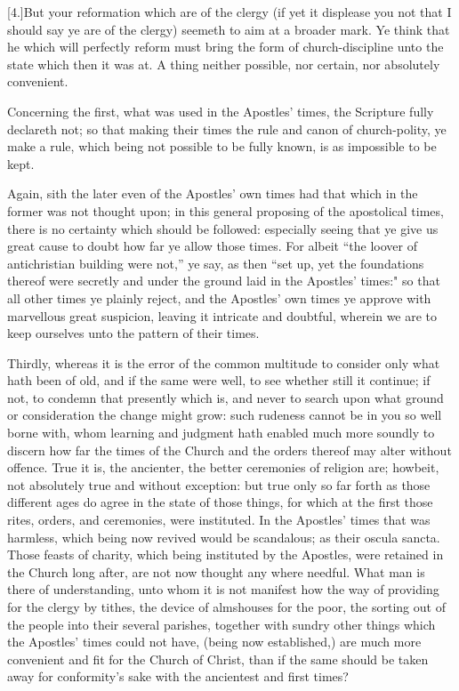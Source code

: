 [4.]But your reformation which are of the clergy (if yet it displease you not that I should say ye are of the clergy) seemeth to aim at a broader mark. Ye think that he which will perfectly reform must bring the form of church-discipline unto the state which then it was at. A thing neither possible, nor certain, nor absolutely convenient.

Concerning the first, what was used in the Apostles’ times, the Scripture fully declareth not; so that making their times the rule and canon of church-polity, ye make a rule, which being not possible to be fully known, is as impossible to be kept.

Again, sith the later even of the Apostles’ own times had that which in the former was not thought upon; in this general proposing of the apostolical times, there is no certainty which should be followed: especially seeing that ye give us great cause to doubt how far ye allow those times. For albeit “the loover of antichristian building were not,” ye say, as then “set up, yet the foundations thereof were secretly and under the ground laid in the Apostles’ times:" so that all other times ye plainly reject, and the Apostles’ own times ye approve with marvellous great suspicion, leaving it intricate and doubtful, wherein we are to keep ourselves unto the pattern of their times.

Thirdly, whereas it is the error of the common multitude to consider only what hath been of old, and if the same were well, to see whether still it continue; if not, to condemn that presently which is, and never to search upon what ground or consideration the change might grow: such rudeness cannot be in you so well borne with, whom learning and judgment hath enabled much more soundly to discern how far the times of the Church and the orders thereof may alter without offence. True it is, the ancienter, the better ceremonies of religion are; howbeit, not absolutely true and without exception: but true only so far forth as those different ages do agree in the state of those things, for which at the first those rites, orders, and ceremonies, were instituted. In the Apostles’ times that was harmless, which being now revived would be scandalous; as their oscula sancta. Those feasts of charity, which being instituted by the Apostles, were retained in the Church long after, are not now thought any where needful. What man is there of understanding, unto whom it is not manifest how the way of providing for the clergy by tithes, the device of almshouses for the poor, the sorting out of the people into their several parishes, together with sundry other things which the Apostles’ times could not have, (being now established,) are much more convenient and fit for the Church of Christ, than if the same should be taken away for conformity’s sake with the ancientest and first times?

